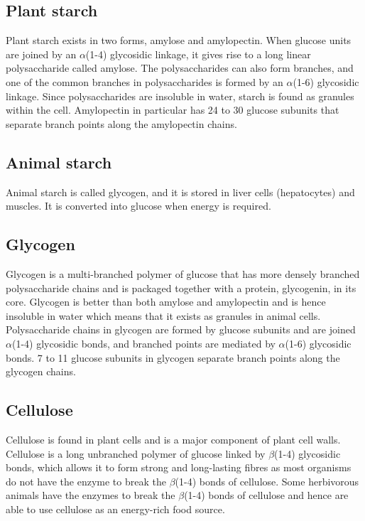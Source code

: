 \documentclass[11pt]{article}
\begin{document}
\subsection{Plant starch}
\label{sec:org12a2750}
Plant starch exists in two forms, amylose and amylopectin. When glucose units are joined by an \(\alpha\)(1-4) glycosidic linkage, it gives rise to a long linear polysaccharide called amylose. The polysaccharides can also form branches, and one of the common branches in polysaccharides is formed by an \(\alpha\)(1-6) glycosidic linkage. Since polysaccharides are insoluble in water, starch is found as granules within the cell. Amylopectin in particular has 24 to 30 glucose subunits that separate branch points along the amylopectin chains.

\subsection{Animal starch}
\label{sec:org6844e50}
Animal starch is called glycogen, and it is stored in liver cells (hepatocytes) and muscles. It is converted into glucose when energy is required.

\subsection{Glycogen}
\label{sec:org6958f41}
Glycogen is a multi-branched polymer of glucose that has more densely branched polysaccharide chains and is packaged together with a protein, glycogenin, in its core. Glycogen is better than both amylose and amylopectin and is hence insoluble in water which means that it exists as granules in animal cells.
\\[0pt]

Polysaccharide chains in glycogen are formed by glucose subunits and are joined \(\alpha\)(1-4) glycosidic bonds, and branched points are mediated by \(\alpha\)(1-6) glycosidic bonds. 7 to 11 glucose subunits in glycogen separate branch points along the glycogen chains.

\subsection{Cellulose}
\label{sec:orgd37c9fb}
Cellulose is found in plant cells and is a major component of plant cell walls. Cellulose is a long unbranched polymer of glucose linked by \(\beta\)(1-4) glycosidic bonds, which allows it to form strong and long-lasting fibres as most organisms do not have the enzyme to break the \(\beta\)(1-4) bonds of cellulose. Some herbivorous animals have the enzymes to break the \(\beta\)(1-4) bonds of cellulose and hence are able to use cellulose as an energy-rich food source.
\end{document}
